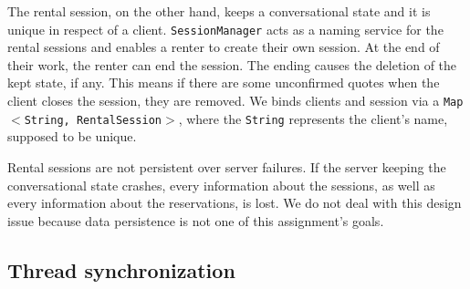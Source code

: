 The rental session, on the other hand, keeps a conversational state and it is unique in respect of a client. \texttt{SessionManager} acts as a naming service for the rental sessions and enables a renter to create their own session. At the end of their work, the renter can end the session. The ending causes the deletion of the kept state, if any. This means if there are some unconfirmed quotes when the client closes the session, they are removed. We binds clients and session via a \texttt{Map$<$String, RentalSession$>$}, where the \texttt{String} represents the client's name, supposed to be unique.

Rental sessions are not persistent over server failures. If the server keeping the conversational state crashes, every information about the sessions, as well as every information about the reservations, is lost. We do not deal with this design issue because data persistence is not one of this assignment's goals. 

\subsection{Thread synchronization}